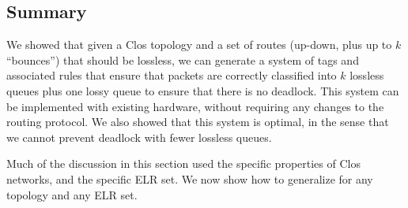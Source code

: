 \subsection {Summary}

We showed that given a Clos topology and a set of routes (up-down, plus up to $k$
``bounces'') that should be lossless, we can generate a system of tags and
associated rules that ensure that packets are correctly classified into $k$
lossless queues plus one lossy queue to ensure that there is no deadlock.   This system can be
implemented with existing hardware, without requiring any changes to the routing
protocol. We also showed that this system is optimal, in the sense that we
cannot prevent deadlock with fewer lossless queues.

Much of the discussion in this section used the specific properties of Clos
networks, and the specific ELR set. We now show how to generalize \sysname{} for
any topology and any ELR set.
